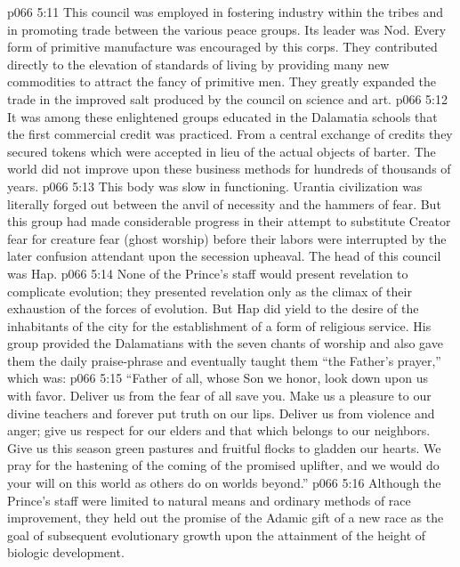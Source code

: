 \pc \vs p066 5:11 \bibnobreakspace {} This council was employed in fostering industry within the tribes and in promoting trade between the various peace groups. Its leader was Nod. Every form of primitive manufacture was encouraged by this corps. They contributed directly to the elevation of standards of living by providing many new commodities to attract the fancy of primitive men. They greatly expanded the trade in the improved salt produced by the council on science and art.
\vs p066 5:12 It was among these enlightened groups educated in the Dalamatia schools that the first commercial credit was practiced. From a central exchange of credits they secured tokens which were accepted in lieu of the actual objects of barter. The world did not improve upon these business methods for hundreds of thousands of years.\plusone
\pc \vs p066 5:13 \bibnobreakspace {} This body was slow in functioning. Urantia civilization was literally forged out between the anvil of necessity and the hammers of fear. But this group had made considerable progress in their attempt to substitute Creator fear for creature fear (ghost worship) before their labors were interrupted by the later confusion attendant upon the secession upheaval. The head of this council was Hap.
\vs p066 5:14 None of the Prince’s staff would present revelation to complicate evolution; they presented revelation only as the climax of their exhaustion of the forces of evolution. But Hap did yield to the desire of the inhabitants of the city for the establishment of a form of religious service. His group provided the Dalamatians with the seven chants of worship and also gave them the daily praise\hyp{}phrase and eventually taught them “the Father’s prayer,” which was:
\pc \vs p066 5:15 “Father of all, whose Son we honor, look down upon us with favor. Deliver us from the fear of all save you. Make us a pleasure to our divine teachers and forever put truth on our lips. Deliver us from violence and anger; give us respect for our elders and that which belongs to our neighbors. Give us this season green pastures and fruitful flocks to gladden our hearts. We pray for the hastening of the coming of the promised uplifter, and we would do your will on this world as others do on worlds beyond.”
\pc \vs p066 5:16 Although the Prince’s staff were limited to natural means and ordinary methods of race improvement, they held out the promise of the Adamic gift of a new race as the goal of subsequent evolutionary growth upon the attainment of the height of biologic development.
